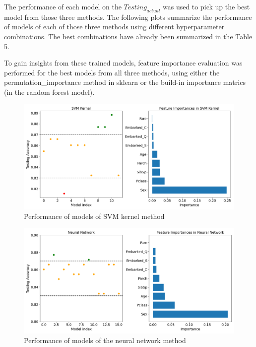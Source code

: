 The performance of each model on the $Testing_{actual}$ was used to pick up the best model from those three methods. The following plots summarize the performance of  models of each of those three methods using different hyperparameter combinations. The best combinations have already been summarized in the Table 5. 

To gain insights from these trained models, feature importance evaluation was performed for the best models from all three methods, using either the permutation\_importance method in sklearn or the build-in importance matrics (in the random forest model).

\begin{figure}[H]
    \centering
    \includegraphics[width=140mm]{SVM.png}
    \caption{Performance of models of SVM kernel method}
    \label{SVM}
\end{figure} 

\begin{figure}[H]
    \centering
    \includegraphics[width=140mm]{NN.png}
    \caption{Performance of models of the neural network method}
    \label{NN}
\end{figure} 

